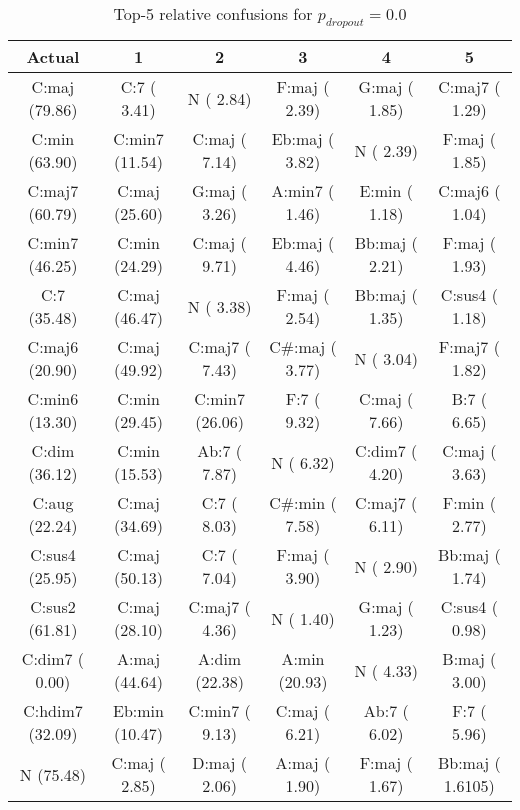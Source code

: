 \begin{table}[h]
\begin{center}
\begin{scriptsize}
\caption{Top-5 relative confusions for $p_{dropout} = 0.0$}
\label{tab:baseline_confs}
\begin{tabular}{c || c | c | c | c | c |}
\hline
Actual & 1 & 2 & 3 & 4 & 5 \\
\hline
C:maj (79.86) &     C:7 ( 3.41) &        N ( 2.84) &    F:maj ( 2.39) &    G:maj ( 1.85) &   C:maj7 ( 1.29) \\
C:min (63.90) &  C:min7 (11.54) &    C:maj ( 7.14) &   Eb:maj ( 3.82) &        N ( 2.39) &    F:maj ( 1.85) \\
C:maj7 (60.79) &   C:maj (25.60) &    G:maj ( 3.26) &   A:min7 ( 1.46) &    E:min ( 1.18) &   C:maj6 ( 1.04) \\
C:min7 (46.25) &   C:min (24.29) &    C:maj ( 9.71) &   Eb:maj ( 4.46) &   Bb:maj ( 2.21) &    F:maj ( 1.93) \\
C:7 (35.48) &   C:maj (46.47) &        N ( 3.38) &    F:maj ( 2.54) &   Bb:maj ( 1.35) &   C:sus4 ( 1.18) \\
\hline
C:maj6 (20.90) &   C:maj (49.92) &   C:maj7 ( 7.43) &   C\#:maj ( 3.77) &        N ( 3.04) &   F:maj7 ( 1.82) \\
C:min6 (13.30) &   C:min (29.45) &   C:min7 (26.06) &      F:7 ( 9.32) &    C:maj ( 7.66) &      B:7 ( 6.65) \\
C:dim (36.12) &   C:min (15.53) &     Ab:7 ( 7.87) &        N ( 6.32) &   C:dim7 ( 4.20) &    C:maj ( 3.63) \\
C:aug (22.24) &   C:maj (34.69) &      C:7 ( 8.03) &   C\#:min ( 7.58) &   C:maj7 ( 6.11) &    F:min ( 2.77) \\
C:sus4 (25.95) &   C:maj (50.13) &      C:7 ( 7.04) &    F:maj ( 3.90) &        N ( 2.90) &   Bb:maj ( 1.74) \\
C:sus2 (61.81) &   C:maj (28.10) &   C:maj7 ( 4.36) &        N ( 1.40) &    G:maj ( 1.23) &   C:sus4 ( 0.98) \\
C:dim7 ( 0.00) &   A:maj (44.64) &    A:dim (22.38) &    A:min (20.93) &        N ( 4.33) &    B:maj ( 3.00) \\
C:hdim7 (32.09) &  Eb:min (10.47) &   C:min7 ( 9.13) &    C:maj ( 6.21) &     Ab:7 ( 6.02) &      F:7 ( 5.96) \\
\hline
N (75.48) &   C:maj ( 2.85) &    D:maj ( 2.06) &    A:maj ( 1.90) &    F:maj ( 1.67) &   Bb:maj ( 1.6105) \\
\hline
\end{tabular}
\end{scriptsize}
\end{center}
\end{table}


